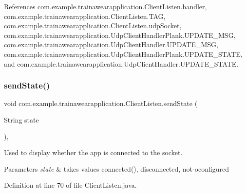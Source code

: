 References com.\+example.\+trainawearapplication.\+Client\+Listen.\+handler, com.\+example.\+trainawearapplication.\+Client\+Listen.\+T\+AG, com.\+example.\+trainawearapplication.\+Client\+Listen.\+udp\+Socket, com.\+example.\+trainawearapplication.\+Udp\+Client\+Handler\+Plank.\+U\+P\+D\+A\+T\+E\+\_\+\+M\+SG, com.\+example.\+trainawearapplication.\+Udp\+Client\+Handler.\+U\+P\+D\+A\+T\+E\+\_\+\+M\+SG, com.\+example.\+trainawearapplication.\+Udp\+Client\+Handler\+Plank.\+U\+P\+D\+A\+T\+E\+\_\+\+S\+T\+A\+TE, and com.\+example.\+trainawearapplication.\+Udp\+Client\+Handler.\+U\+P\+D\+A\+T\+E\+\_\+\+S\+T\+A\+TE.

\mbox{\label{classcom_1_1example_1_1trainawearapplication_1_1_client_listen_ab1d26a5c46561734eef258d64a6d7723}} 
\subsubsection{\texorpdfstring{sendState()}{sendState()}}
{\footnotesize\ttfamily void com.\+example.\+trainawearapplication.\+Client\+Listen.\+send\+State (\begin{DoxyParamCaption}\item[{String}]{state }\end{DoxyParamCaption})\hspace{0.3cm}{\ttfamily [inline]}, {\ttfamily [private]}}



Used to display whether the app is connected to the socket. 


\begin{DoxyParams}{Parameters}
{\em state} & takes values connected(), disconnected, not-\/oconfigured \\
\hline
\end{DoxyParams}


Definition at line 70 of file Client\+Listen.\+java.


\begin{DoxyCode}{0}

\end{DoxyCode}


